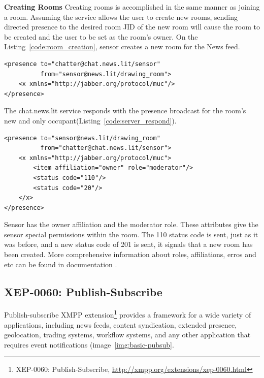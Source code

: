 \textbf{Creating Rooms}
\newline
Creating rooms is accomplished in the same manner as joining a room. Assuming the service allows the user to create new rooms, sending directed presence to the desired room JID of the new room will cause the room to be created and the user to be set as the room’s owner. On the Listing~\ref{code:room_creation}, sensor creates a new room for the News feed.

	\begin{lstlisting}[label=code:room_creation,caption=MUC Room Creation]
<presence to="chatter@chat.news.lit/sensor"
          from="sensor@news.lit/drawing_room">
    <x xmlns="http://jabber.org/protocol/muc"/>
</presence>
	\end{lstlisting}

The chat.news.lit service responds with the presence broadcast for the room’s new and only occupant(Listing~\ref{code:server_respond}).

	\begin{lstlisting}[label=code:server_respond,caption=Server Respond to Room Creation]
<presence to="sensor@news.lit/drawing_room"
          from="chatter@chat.news.lit/sensor">
    <x xmlns="http://jabber.org/protocol/muc">
        <item affiliation="owner" role="moderator"/>
        <status code="110"/>
        <status code="20"/>
    </x>
</presence>
		\end{lstlisting}

Sensor has the owner affiliation and the moderator role. These attributes give the sensor special permissions within the room. The 110 status code is sent, just as it was before, and a new status code of 201 is sent, it signals that a new room has been created. More comprehensive information about roles, affiliations, erros and etc can be found in documentation \cite{XMPPbook}.

\subsection{XEP-0060: Publish-Subscribe}
Publish-subscribe XMPP extension\footnote{XEP-0060: Publish-Subscribe, \url{http://xmpp.org/extensions/xep-0060.html}} provides a framework for a wide variety of applications, including news feeds, content syndication, extended presence, geolocation, trading systems, workflow systems, and any other application that requires event notifications (image~\ref{img:basic-pubsub}.

